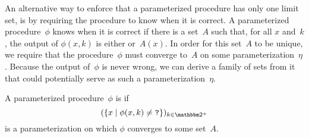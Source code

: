 An alternative way to enforce that a parameterized procedure has only one limit set, is by requiring the procedure to know when it is correct.
A parameterized procedure~$\phi$ knows when it is correct if there is a set~$A$ such that, for all $x$ and~$k$, the output of $\phi(x, k)$ is either  or~$A(x)$.
In order for this set~$A$ to be unique, we require that the procedure~$\phi$ must converge to~$A$ on some parameterization~$\eta$.
Because the output of~$\phi$ is never wrong, we can derive a family of sets from it that could potentially serve as such a parameterization~$\eta$.
\begin{definition}
\label{def:direct}%
  A parameterized procedure~$\phi$ is  if
  \begin{equation*}
    (\{x \st \phi(x, k) \neq \bits{?}\})_{k \in \binary^+}
  \end{equation*}
  is a parameterization on which $\phi$ converges to some set~$A$.
\end{definition}

